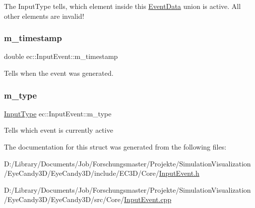 The Input\+Type tells, which element inside this \mbox{\hyperlink{unionec_1_1_event_data}{Event\+Data}} union is active. All other elements are invalid! \mbox{\label{structec_1_1_input_event_ada54908facf585cb714bd6712d8f6c4d}} 
\subsubsection{\texorpdfstring{m\+\_\+timestamp}{m\_timestamp}}
{\footnotesize\ttfamily double ec\+::\+Input\+Event\+::m\+\_\+timestamp}

Tells when the event was generated. \mbox{\label{structec_1_1_input_event_a07aadaf18da2952478b803bbd4122bb7}} 
\subsubsection{\texorpdfstring{m\+\_\+type}{m\_type}}
{\footnotesize\ttfamily \mbox{\hyperlink{namespaceec_ae2d697393ea83b34b18ab14eb5dacbca}{Input\+Type}} ec\+::\+Input\+Event\+::m\+\_\+type}

Tells which event is currently active 

The documentation for this struct was generated from the following files\+:\begin{DoxyCompactItemize}
\item 
D\+:/\+Library/\+Documents/\+Job/\+Forschungsmaster/\+Projekte/\+Simulation\+Visualization/\+Eye\+Candy3\+D/\+Eye\+Candy3\+D/include/\+E\+C3\+D/\+Core/\mbox{\hyperlink{_input_event_8h}{Input\+Event.\+h}}\item 
D\+:/\+Library/\+Documents/\+Job/\+Forschungsmaster/\+Projekte/\+Simulation\+Visualization/\+Eye\+Candy3\+D/\+Eye\+Candy3\+D/src/\+Core/\mbox{\hyperlink{_input_event_8cpp}{Input\+Event.\+cpp}}\end{DoxyCompactItemize}
